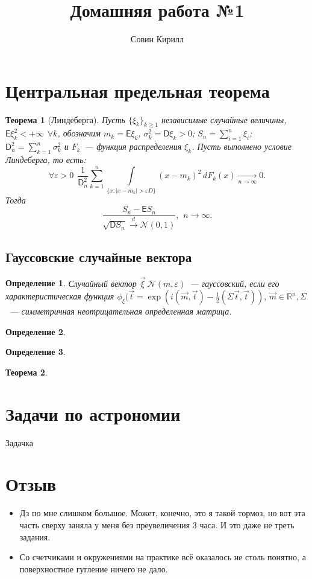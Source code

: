 \documentclass[a5paper,11pt]{article}
\title{Домашняя работа №1}
\author{Совин Кирилл}
\date{}
\newtheorem{thm}{Теорема}[section]
\newtheorem{definition}{Определение}
\newcounter{thetask}  %
\newenvironment{task}{\thetask}{s}
\begin{document}
    \section{Центральная предельная теорема}
    \begin{thm}[Линдеберга]
    	Пусть $\{ \xi_k \}_{k \geqslant 1}$ независимые случайные величины, $ \mathsf{E}\xi_k^2 <   +\infty \hspace{5pt} \forall k$, обозначим $m_k= \mathsf{E}\xi_k$, $\sigma_k^2=\mathsf{D}\xi_k>0$; $S_n=\sum\limits_{i=1}^{n} \xi_i$; $\mathsf{D}_n^2=\sum\limits_{k=1}^{n} \sigma_k^2$ и $F_k$~--- функция распределения $\xi_k$. Пусть выполнено условие Линдеберга, то есть:
    	$$ \forall \varepsilon > 0 \hspace{5pt} \frac{1}{\mathsf{D}_n^2} \sum\limits_{k=1}^{n} \int\limits_{\{x: |x-m_k| > \varepsilon D \} } (x-m_k)^2 \, dF_k(x) \xrightarrow[n \rightarrow \infty]{} 0.$$
    	Тогда $$\frac{ S_n - \mathsf{E}S_n } { \sqrt{\mathsf{D}S_n} \xrightarrow{d} \mathcal{N}(0,1) }, \hspace{5pt} n \rightarrow \infty .$$
    \end{thm}
    \subsection*{Гауссовские случайные вектора}
	\begin{definition}
	Случайный вектор $\vec{\xi} ~ \mathcal{N}(m,\varepsilon)$~--- гауссовский, если его характеристическая функция $ \phi_\xi(\vec{t} = \exp(i(\vec{m},\vec{t}) - \frac{1}{2}(\Sigma\vec{t},\vec{t})), \, \vec{m} \in \mathbb{R}^n, \Sigma$~--- симметричная неотрицательная определенная матрица.
	\end{definition}
	\begin{definition}
		
	\end{definition}
	\begin{definition}
		
	\end{definition}
	\begin{thm}
		
	\end{thm}
	\section{Задачи по астрономии}
		Задачка
	\section{Отзыв}
	\begin{itemize}
		\item Дз по мне слишком большое. Может, конечно, это я такой тормоз, но вот эта часть сверху заняла у меня без преувеличения 3 часа. И это даже не треть задания. 
		\item Со счетчиками и окружениями на практике всё оказалось не столь понятно, а поверхностное гугление ничего не дало. 
	\end{itemize}
\end{document}
